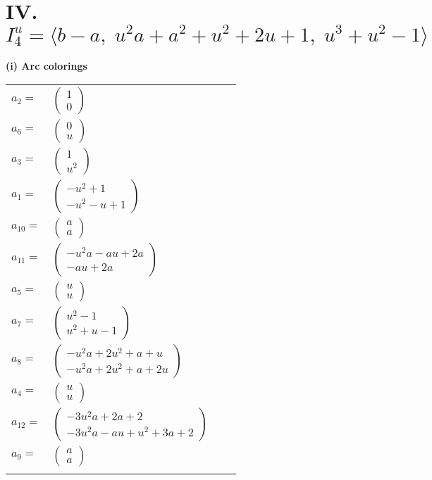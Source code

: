 \documentclass[1p]{elsarticle_modified}
\theoremstyle{definition}
\begin{document}
\centering \section*{IV. $I^u_{4}= \langle b- a,\;u^2 a+a^2+u^2+2 u+1,\;u^3+u^2-1 \rangle$}
\flushleft \textbf{(i) Arc colorings}\\
\begin{tabular}{m{7pt} m{180pt} m{7pt} m{180pt} }
\flushright $a_{2}=$&$\begin{pmatrix}1\\0\end{pmatrix}$ \\
\flushright $a_{6}=$&$\begin{pmatrix}0\\u\end{pmatrix}$ \\
\flushright $a_{3}=$&$\begin{pmatrix}1\\u^2\end{pmatrix}$ \\
\flushright $a_{1}=$&$\begin{pmatrix}- u^2+1\\- u^2- u+1\end{pmatrix}$ \\
\flushright $a_{10}=$&$\begin{pmatrix}a\\a\end{pmatrix}$ \\
\flushright $a_{11}=$&$\begin{pmatrix}- u^2 a- a u+2 a\\- a u+2 a\end{pmatrix}$ \\
\flushright $a_{5}=$&$\begin{pmatrix}u\\u\end{pmatrix}$ \\
\flushright $a_{7}=$&$\begin{pmatrix}u^2-1\\u^2+u-1\end{pmatrix}$ \\
\flushright $a_{8}=$&$\begin{pmatrix}- u^2 a+2 u^2+a+u\\- u^2 a+2 u^2+a+2 u\end{pmatrix}$ \\
\flushright $a_{4}=$&$\begin{pmatrix}u\\u\end{pmatrix}$ \\
\flushright $a_{12}=$&$\begin{pmatrix}-3 u^2 a+2 a+2\\-3 u^2 a- a u+u^2+3 a+2\end{pmatrix}$ \\
\flushright $a_{9}=$&$\begin{pmatrix}a\\a\end{pmatrix}$\\&\end{tabular}
\end{document}
